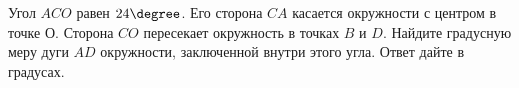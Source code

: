 \begin{ex}
	\begin{condition}
		Угол \( ACO \) равен \( 24\degree\). Его сторона \( CA \) касается окружности с центром в точке \( О \). Сторона \( CO \) пересекает окружность в точках \( B \) и \( D \). Найдите градусную меру дуги \( AD \) окружности, заключенной внутри этого угла. Ответ дайте в градусах.
	\end{condition}
\end{ex}